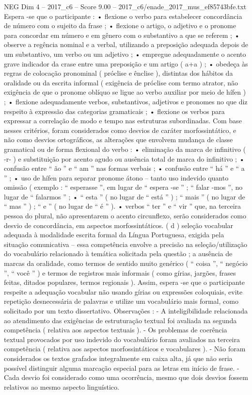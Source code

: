\begin{textsample}{NEG Dim 4 – 2017\_c6 – Score 9.00 – 2017\_c6/enade\_2017\_mus\_ef85743bfe.txt}
Espera -se que o participante : • flexione o verbo para estabelecer concordância de número com o sujeito da frase ; • flexione o artigo, o adjetivo e o pronome para concordar em número e em gênero com o substantivo a que se referem ; • observe a regência nominal e a verbal, utilizando a preposição adequada depois de um substantivo, um verbo ou um adjetivo ; • empregue adequadamente o acento grave indicador da crase entre uma preposição e um artigo ( a+a ) ; • obedeça às regras de colocação pronominal ( próclise e ênclise ), distintas dos hábitos da oralidade ou da escrita informal ( exigência de próclise com termo atrator, não exigência de que o pronome oblíquo se ligue ao verbo auxiliar por meio de hífen ) ; • flexione adequadamente verbos, substantivos, adjetivos e pronomes no que diz respeito à expressão das categorias gramaticais ; • flexione os verbos para expressar a correlação de modo e tempo nas estruturas subordinadas.
Com base nesses critérios, foram considerados como desvios de caráter morfossintático, e não como desvios ortográficos, as alterações que envolvem mudança de classe gramatical ou de forma flexional do verbo : • eliminação da marca de infinitivo ( -r- ) e substituição por acento agudo ou ausência total de marca do infinitivo ; • confusão entre “ ão ” e “ am ” nas formas verbais ; • confusão entre “ há ” e “ a ” ; • uso de hífen para separar pronome átono – tanto uso indevido quanto omissão ( exemplo : “ esperasse ”, em lugar de “ espera -se ” ; “ falar -mos ”, no lugar de “ falarmos ” ; • “ esta ” ( no lugar de “ está ” ) ; “ mais ” ( no lugar de “ mas ” ) ; “ e ” ( no lugar de “ é ” ). • verbos “ ter ” e “ vir ” que, na terceira pessoa do plural, não apresentarem o acento circunflexo, serão considerados como desvio de concordância, em aspectos morfossintáticos. ( d ) seleção vocabular adequada à modalidade escrita formal da Língua Portuguesa, exigida pela situação comunicativa – essa competência envolve a precisão na seleção/utilização do vocabulário relacionado à temática solicitada pela questão ; a ausência de marcas da oralidade, como termos de sentido muito genérico ( “ coisa ”, “ negócio ”, “ você ” ) e termos de registros mais informais ( como gírias, jargões, frases feitas, ditados populares, termos regionais ).
Assim, espera -se que o participante respeite a adequação vocabular não usando gírias ou expressões coloquiais, evite repetição desnecessária de palavras e utilize um vocabulário mais formal, como solicitado por um texto dissertativo.
Observações : - A inteligibilidade relacionada ao atendimento das exigências de estruturação textual foi avaliada na segunda competência ( relativa aos aspectos textuais ). - Os problemas de coerência textual provocados por uso indevido do vocabulário foram avaliados na terceira competência ( relativa aos aspectos morfossintáticos e vocabulares ). - Não foram considerados os textos grafados integralmente em caixa alta, já que não seria possível distinguir alguma marcação especial para as letras em início de frase. - Cada desvio foi considerado como uma ocorrência, mesmo que dois desvios fossem relativos ao mesmo aspecto linguístico.

\end{textsample}

